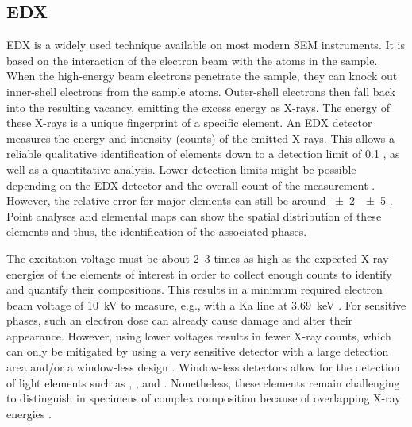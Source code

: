 
\subsection[Energy-dispersive X-ray spectroscopy]{\Acl*{EDX}}
\label{sec:edx}

\ac{EDX} is a widely used technique available on most modern \ac{SEM} instruments.
It is based on the interaction of the electron beam with the atoms in the sample.
When the high-energy beam electrons penetrate the sample, they can knock out inner-shell electrons from the sample atoms.
Outer-shell electrons then fall back into the resulting vacancy, emitting the excess energy as X-rays.
The energy of these X-rays is a unique fingerprint of a specific element.
An \ac{EDX} detector measures the energy and intensity (counts) of the emitted X-rays.
This allows a reliable qualitative identification of elements down to a detection limit of \qty{0.1}{\wtpercent} \cite{goldstein.2018, jeol.2020, kleiner.2022b}, as well as a quantitative analysis.
Lower detection limits might be possible depending on the \ac{EDX} detector and the overall count of the measurement \cite{goldstein.2018}.
However, the relative error for major elements can still be around \qtyrange{+-2}{+-5}{\wtpercent} \cite{jeol.2020}.
Point analyses and elemental maps can show the spatial distribution of these elements and thus, the identification of the associated phases.

The excitation voltage must be about \numrange{2}{3} times as high as the expected X-ray energies of the elements of interest in order to collect enough counts to identify and quantify their compositions.
This results in a minimum required electron beam voltage of \qty{10}{\kilo\volt} to measure, e.g.,  with a \ac{Ka} line at \qty{3.69}{\kilo\electronvolt} \cite{hudson.2003}.
For sensitive phases, such an electron dose can already cause damage and alter their appearance.
However, using lower voltages results in fewer X-ray counts, which can only be mitigated by using a very sensitive detector with a large detection area and/or a window-less design \cite{yamamoto.2016}.
Window-less detectors \cite{tamura.2013} allow for the detection of light elements such as , , and  \cite{yamamoto.2016}.
Nonetheless, these elements remain challenging to distinguish in specimens of complex composition because of overlapping X-ray energies \cite{hudson.2003}.

